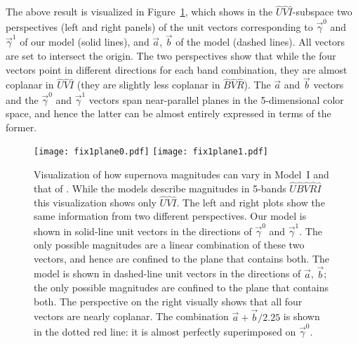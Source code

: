 \documentclass[trackchanges]{aastex62}   	%
\begin{document}
The above result is visualized in Figure~\ref{plane:fig}, which  shows  in the
${\hat{U}}{\hat{V}}\hat{I}$-subspace
two perspectives (left and right panels)
of the unit vectors corresponding to $\vec{\gamma}^0$ and  $\vec{\gamma}^1$ of our model (solid lines),
and $\vec{a}$, $\vec{b}$ of the  model (dashed lines).  All  vectors are set to intersect the origin.
The two perspectives show that while the four vectors point in different directions for each band combination,
they are almost coplanar in ${\hat{U}}{\hat{V}}{\hat{I}}$ (they are slightly less coplanar in ${\hat{B}}{\hat{V}}{\hat{R}}$).  The $\vec{a}$ and $\vec{b}$ vectors and the $\vec{\gamma}^0$ and $\vec{\gamma}^1$
vectors span near-parallel planes in the 5-dimensional color space, and hence the latter can be almost entirely expressed in terms of
the former.

\begin{figure}[htbp] %
   \centering
   \texttt{[image: fix1plane0.pdf]}
   \texttt{[image: fix1plane1.pdf]}
   \caption{
   Visualization of how supernova magnitudes can vary in Model~I and that of .  While the models describe
   magnitudes in 5-bands ${\hat{U}}{\hat{B}}{\hat{V}}{\hat{R}}{\hat{I}}$ this visualization shows only ${\hat{U}}{\hat{V}}{\hat{I}}$.   The left and right plots show the same information from
   two different perspectives.
   Our model is shown in solid-line unit vectors in the directions of $\vec{\gamma}^0$ and $\vec{\gamma}^1$. The only possible magnitudes
   are a linear combination of these two vectors, and hence are confined to the plane that contains both.
   The   model is shown in dashed-line unit vectors
   in the directions of  $\vec{a}$, $\vec{b}$; the only possible magnitudes are confined to the plane that contains both.
   The perspective on the right visually shows that all four vectors are nearly coplanar.  
   The combination $\vec{a}+\vec{b}/2.25$ is shown in the dotted red
   line: it is almost perfectly superimposed on $\vec{\gamma}^0$.
   \label{plane:fig}}
\end{figure}
\end{document}
